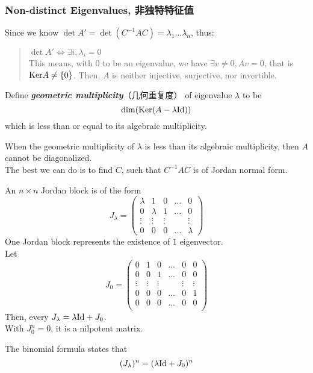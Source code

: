 \subsubsection{Non-distinct Eigenvalues, 非独特特征值}
Since we know $\det A' = \det (C^{-1}AC) = \lambda_{1}\dots \lambda_{n}$, thus:
\begin{quote}
    $\det A' \iff \exists i, \lambda_i = 0$ \\
    This means, with $0$ to be an eigenvalue, we have $\exists v \ne 0, Av = 0$, that is $\text{Ker} A \ne \{0\}$. Then, $A$ is neither injective, surjective, nor invertible.
\end{quote}
\begin{definition}
    Define \textbf{\textit{geometric multiplicity}}（几何重复度） of eigenvalue $\lambda$ to be
    $$\dim (\text{Ker} (A - \lambda \text{Id}))$$
    which is less than or equal to its algebraic multiplicity.
\end{definition}
When the geometric multiplicity of $\lambda$ is less than its algebraic multiplicity, then $A$ cannot be diagonalized. \\
The best we can do is to find $C$, such that $C^{-1}AC$ is of Jordan normal form.
\begin{definition}
    An $n \times n$ Jordan block is of the form
    $$J_\lambda = \begin{pmatrix}
        \lambda & 1 & 0 & \dots & 0 \\
        0 & \lambda & 1 & \dots & 0 \\
        \vdots & \vdots & \vdots & & \vdots \\
        0 & 0 & 0 & \dots & \lambda
    \end{pmatrix}$$
    One Jordan block represents the existence of $1$ eigenvector. \\
    Let
    $$J_0 = \begin{pmatrix}
        0 & 1 & 0 & \dots & 0 & 0 \\
        0 & 0 & 1 & \dots & 0 & 0 \\
        \vdots & \vdots & \vdots & & \vdots & \vdots \\
        0 & 0 & 0 & \dots & 0 & 1 \\
        0 & 0 & 0 & \dots & 0 & 0 \\
    \end{pmatrix}$$
    Then, every $J_\lambda = \lambda \text{Id} + J_0$. \\
    With $J_0^n = 0$, it is a nilpotent matrix.
\end{definition}
\begin{lemma}
    The binomial formula states that
    $$(J_\lambda)^n = (\lambda \text{Id} + J_0)^n$$
\end{lemma}

